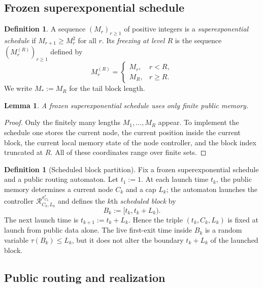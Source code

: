 \documentclass[12pt]{article}
\newtheorem{lemma}[theorem]{Lemma}
\theoremstyle{definition}
\newtheorem{definition}[theorem]{Definition}
\newcommand{\1}{\mathbf{1}}
\begin{document}
\subsection{Frozen superexponential schedule}


\begin{definition}
A sequence $(M_r)_{r\ge 1}$ of positive integers is a
\emph{superexponential schedule} if $M_{r+1}\ge M_r^2$ for all $r$. Its
\emph{freezing at level $R$} is the sequence $(M_r^{(R)})_{r\ge 1}$ defined by
\[
M_r^{(R)}=
\begin{cases}
M_r, & r<R,\\
M_R, & r\ge R.
\end{cases}
\]
We write $M_*:=M_R$ for the tail block length.
\end{definition}

\begin{lemma}
\label{lem:frozen-memory}
A frozen superexponential schedule uses only finite public memory.
\end{lemma}

\begin{proof}
Only the finitely many lengths $M_1,\dots,M_R$ appear. To implement the schedule
one stores the current node, the current position inside the current block, the
current local memory state of the node controller, and the block index truncated at
$R$. All of these coordinates range over finite sets.
\end{proof}

\begin{definition}[Scheduled block partition]
\label{def:scheduled-block-partition}
Fix a frozen superexponential schedule and a public routing automaton. Let
$t_1:=1$. At each launch time $t_k$, the public memory determines a current node
$C_k$ and a cap $L_k$; the automaton launches the controller
$\mathcal R_{C_k,L_k}^{\sigma_{C_k}^*}$ and defines the $k$th \emph{scheduled
block} by
\[
B_k:=[t_k,t_k+L_k).
\]
The next launch time is $t_{k+1}:=t_k+L_k$. Hence the triple $(t_k,C_k,L_k)$ is
fixed at launch from public data alone. The live first-exit time inside $B_k$ is
a random variable $\tau(B_k)\le L_k$, but it does not alter the boundary
$t_k+L_k$ of the launched block.
\end{definition}

\subsection{Public routing and realization}
\end{document}
